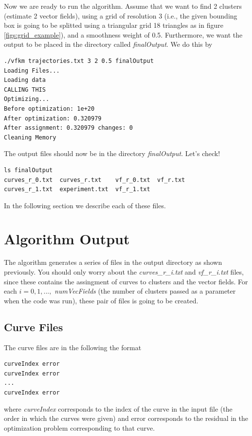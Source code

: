 \documentclass[10pt]{article}
\begin{document}
Now we are ready to run the algorithm. Assume that we want to find 2 clusters
(estimate 2 vector fields), using a grid of resolution 3 (i.e., the given bounding box 
is going to be splitted using a triangular grid 18 triangles as in figure \ref{figs:grid_example}), and a smoothness weight
of 0.5. Furthermore, we want the output to be placed in the directory called \emph{finalOutput}.
We do this by

\begin{lstlisting}
./vfkm trajectories.txt 3 2 0.5 finalOutput
Loading Files...
Loading data
CALLING THIS
Optimizing...
Before optimization: 1e+20
After optimization: 0.320979
After assignment: 0.320979 changes: 0
Cleaning Memory
\end{lstlisting}

The output files should now be in the directory \emph{finalOutput}. Let's check!

\begin{lstlisting}
ls finalOutput
curves_r_0.txt  curves_r.txt    vf_r_0.txt  vf_r.txt
curves_r_1.txt  experiment.txt  vf_r_1.txt
\end{lstlisting}

In the following section we describe each of these files.

\section{Algorithm Output}\label{sec:output_format}
The algorithm generates a series of files in the output directory as shown previously.
You should only worry about the \emph{curves\_r\_i.txt} and \emph{vf\_r\_i.txt} files, since
these contains the assingment of curves to clusters and the vector fields. For each $i=0,1,...,$ \emph{numVecFields} (the number of clusters passed as a parameter when the code was run), these
pair of files is going to be created. 

\subsection{Curve Files}
The curve files are in the following the format

\begin{lstlisting}
curveIndex error
curveIndex error
...
curveIndex error
\end{lstlisting}

where \emph{curveIndex} corresponds to the index of the curve in the
input file (the order in which the curves were given) and error
corresponds to the residual in the optimization problem corresponding
to that curve. 
\end{document}
